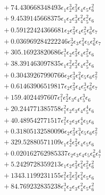 \documentclass[10pt]{article}
\begin{document}
\begin{align*}
&{}  + 74.430668348493 \epsilon_{1} \epsilon_{2}^{3} \epsilon_{3}^{2} \epsilon_{4} \epsilon_{5} \epsilon_{6}^{2} \\
&{}  + 9.4539145668375 \epsilon_{1} \epsilon_{2} \epsilon_{3}^{3} \epsilon_{4}^{2} \epsilon_{5}^{2} \epsilon_{6} \\
&{}  + 0.59122424366681 \epsilon_{2} \epsilon_{3}^{2} \epsilon_{4} \epsilon_{5}^{2} \epsilon_{6}^{3} \epsilon_{7} \\
&{}  + 0.036969284222246 \epsilon_{2}^{3} \epsilon_{3} \epsilon_{4}^{2} \epsilon_{5} \epsilon_{6}^{2} \epsilon_{7} \\
&{}  + 305.16923820686 \epsilon_{1}^{3} \epsilon_{2} \epsilon_{3}^{2} \epsilon_{4} \epsilon_{5}^{2} \epsilon_{6} \\
&{}  + 38.391463097835 \epsilon_{1} \epsilon_{2}^{2} \epsilon_{3}^{2} \epsilon_{4} \epsilon_{5}^{3} \epsilon_{6} \\
&{}  + 0.30439267990766 \epsilon_{2} \epsilon_{3}^{3} \epsilon_{4}^{2} \epsilon_{5} \epsilon_{6} \epsilon_{7}^{2} \\
&{}  + 0.61463906519817 \epsilon_{2} \epsilon_{3}^{2} \epsilon_{4} \epsilon_{5}^{3} \epsilon_{6}^{2} \epsilon_{7} \\
&{}  + 159.4024497607 \epsilon_{1}^{2} \epsilon_{2}^{2} \epsilon_{3} \epsilon_{4} \epsilon_{5}^{3} \epsilon_{6} \\
&{}  + 20.244771385758 \epsilon_{1}^{2} \epsilon_{2} \epsilon_{3} \epsilon_{4} \epsilon_{5}^{4} \epsilon_{6} \\
&{}  + 40.489542771517 \epsilon_{1}^{2} \epsilon_{2} \epsilon_{3} \epsilon_{4}^{4} \epsilon_{5} \epsilon_{6} \\
&{}  + 0.31805132580096 \epsilon_{2} \epsilon_{3}^{2} \epsilon_{4}^{3} \epsilon_{5} \epsilon_{6} \epsilon_{7}^{2} \\
&{}  + 329.52880571109 \epsilon_{1} \epsilon_{2}^{4} \epsilon_{3}^{2} \epsilon_{4} \epsilon_{5} \epsilon_{6} \\
&{}  + 0.020162762985337 \epsilon_{2} \epsilon_{3} \epsilon_{4} \epsilon_{5} \epsilon_{6}^{2} \epsilon_{7}^{4} \\
&{}  + 5.2429728359213 \epsilon_{1} \epsilon_{2} \epsilon_{3}^{2} \epsilon_{4}^{2} \epsilon_{5}^{2} \epsilon_{6}^{2} \\
&{}  + 1343.1199231155 \epsilon_{1}^{2} \epsilon_{2}^{2} \epsilon_{3}^{2} \epsilon_{4}^{2} \epsilon_{5} \epsilon_{6} \\
&{}  + 84.769232835238 \epsilon_{1}^{3} \epsilon_{2} \epsilon_{3} \epsilon_{4}^{2} \epsilon_{5} \epsilon_{6}^{2} \\

\end{align*}
\end{document}
